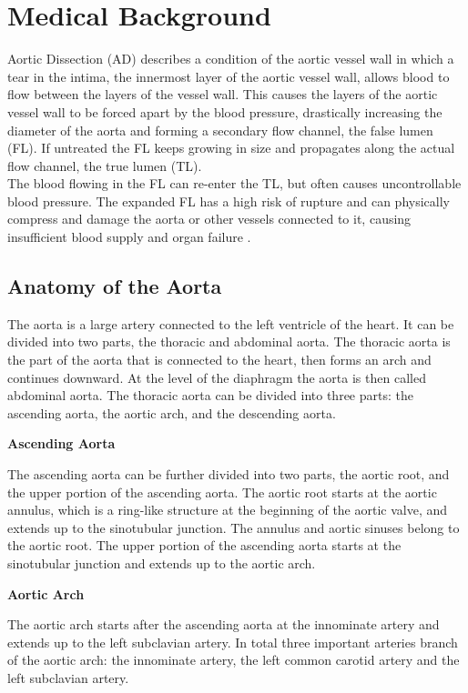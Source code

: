 \documentclass[thesis.tex]{subfiles}
\begin{document}
\section{Medical Background}
Aortic Dissection (AD) describes a condition of the aortic vessel wall in which a tear in the intima, the innermost layer of the aortic vessel wall, allows blood to flow between the layers of the vessel wall. This causes the layers of the aortic vessel wall to be forced apart by the blood pressure, drastically increasing the diameter of the aorta and forming a secondary flow channel, the false lumen (FL). If untreated the FL keeps growing in size and propagates along the actual flow channel, the true lumen (TL). \\
The blood flowing in the FL can re-enter the TL, but often causes uncontrollable blood pressure. The expanded FL has a high risk of rupture and can physically compress \cite{criado2011aortic} and damage the aorta or other vessels connected to it, causing insufficient blood supply and organ failure \cite{meszaros2000epidemiology,desanctis1987aortic}. 

\subsection{Anatomy of the Aorta}
The aorta is a large artery connected to the left ventricle of the heart. It can be divided into two parts, the thoracic and abdominal aorta. The thoracic aorta is the part of the aorta that is connected to the heart, then forms an arch and continues downward. At the level of the diaphragm the aorta is then called abdominal aorta. The thoracic aorta can be divided into three parts: the ascending aorta, the aortic arch, and the descending aorta.

\textbf{Ascending Aorta}

The ascending aorta can be further divided into two parts, the aortic root, and the upper portion of the ascending aorta. 
The aortic root starts at the aortic annulus, which is a ring-like structure at the beginning of the aortic valve, and extends up to the sinotubular junction. The annulus and aortic sinuses belong to the aortic root. The upper portion of the ascending aorta starts at the sinotubular junction and extends up to the aortic arch.

\textbf{Aortic Arch}

The aortic arch starts after the ascending aorta at the innominate artery and extends up to the left subclavian artery. In total three important arteries branch of the aortic arch: the innominate artery, the left common carotid artery and the left subclavian artery. 
\end{document}

